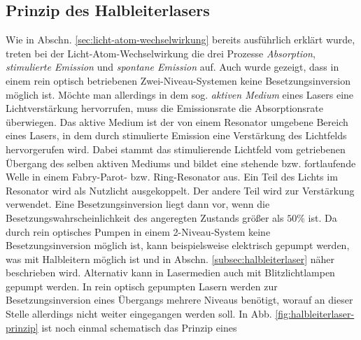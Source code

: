 \subsection{Prinzip des Halbleiterlasers}\label{subsec:prinzip_halbleiterlaser}
Wie in Abschn. \ref{sec:licht-atom-wechselwirkung} bereits ausführlich erklärt
wurde, treten bei der Licht-Atom-Wechselwirkung die drei Prozesse
\textit{Absorption}, \textit{stimulierte Emission} und \textit{spontane Emission} auf. Auch wurde
gezeigt, dass in einem rein optisch betriebenen Zwei-Niveau-Systemen keine
Besetzungsinversion möglich ist.
Möchte man allerdings in dem sog. \textit{aktiven Medium} eines Lasers eine Lichtverstärkung
hervorrufen, muss die Emissionsrate die Absorptionsrate überwiegen. Das aktive Medium ist der von einem Resonator
umgebene Bereich eines Lasers, in dem durch stimulierte Emission eine
Verstärkung des Lichtfelds hervorgerufen wird. Dabei stammt das stimulierende
Lichtfeld vom getriebenen Übergang des selben aktiven Mediums und bildet eine
stehende bzw. fortlaufende Welle in einem Fabry-Parot- bzw. Ring-Resonator aus.
Ein Teil des Lichts im Resonator wird als Nutzlicht ausgekoppelt. Der andere Teil wird zur Verstärkung verwendet. Eine
Besetzungsinversion liegt dann vor, wenn die Besetzungswahrscheinlichkeit des
angeregten Zustands größer als $50\%$ ist.
Da durch rein optisches Pumpen in einem
2-Niveau-System keine Besetzungsinversion möglich ist, kann beispielsweise
elektrisch gepumpt werden, was mit Halbleitern möglich ist und in Abschn.
\ref{subsec:halbleiterlaser} näher beschrieben wird. Alternativ kann in
Lasermedien auch mit Blitzlichtlampen gepumpt werden. In rein optisch gepumpten
Lasern werden zur Besetzungsinversion eines Übergangs mehrere Niveaus benötigt,
worauf an dieser Stelle allerdings nicht weiter eingegangen werden soll. In Abb.
\ref{fig:halbleiterlaser-prinzip} ist noch einmal schematisch das Prinzip eines
